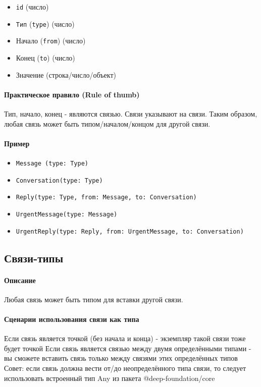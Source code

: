 \documentclass{article}
\begin{document}
\begin{itemize}
  \item \texttt{id} (число)
  \item \texttt{Тип} (\texttt{type}) (число)
  \item Начало (\texttt{from}) (число)
  \item Конец (\texttt{to}) (число)
  \item Значение (строка/число/объект)
\end{itemize}

\paragraph{Практическое правило (Rule of thumb)}
Тип, начало, конец - являются связью. Связи указывают на связи. Таким образом,
любая связь может быть типом/началом/концом для другой связи.

\paragraph{Пример}

\begin{itemize}
  \item \texttt{Message (type: Type)}
  \item \texttt{Conversation(type: Type)}
  \item \texttt{Reply(type: Type, from: Message, to: Conversation)}
  \item \texttt{UrgentMessage(type: Message)}
  \item \texttt{UrgentReply(type: Reply, from: UrgentMessage, to:
          Conversation)}
\end{itemize}

\subsection{Связи-типы}
\paragraph{Описание}
Любая связь может быть типом для вставки другой связи.
\paragraph{Сценарии использования связи как типа}
Если связь является точкой (без начала и конца) - экземпляр такой связи тоже
будет точкой
Если связь является связью между двумя определёнными типами - вы сможете
вставить связь только между связями этих определённых типов
Совет: если связь должна вести от/до неопределённого типа связи, то следует
использовать встроенный тип Any из пакета @deep-foundation/core
\end{document}
